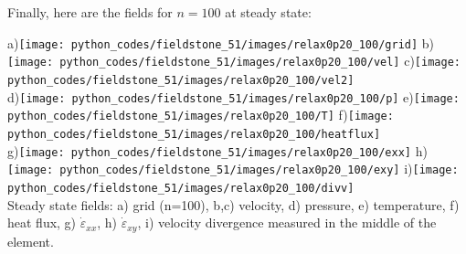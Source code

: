 Finally, here are the fields for $n=100$ at steady state:

\begin{center}
a)\texttt{[image: python\_codes/fieldstone\_51/images/relax0p20\_100/grid]}
b)\texttt{[image: python\_codes/fieldstone\_51/images/relax0p20\_100/vel]}
c)\texttt{[image: python\_codes/fieldstone\_51/images/relax0p20\_100/vel2]}\\
d)\texttt{[image: python\_codes/fieldstone\_51/images/relax0p20\_100/p]}
e)\texttt{[image: python\_codes/fieldstone\_51/images/relax0p20\_100/T]}
f)\texttt{[image: python\_codes/fieldstone\_51/images/relax0p20\_100/heatflux]}\\
g)\texttt{[image: python\_codes/fieldstone\_51/images/relax0p20\_100/exx]}
h)\texttt{[image: python\_codes/fieldstone\_51/images/relax0p20\_100/exy]}
i)\texttt{[image: python\_codes/fieldstone\_51/images/relax0p20\_100/divv]}\\
{\small Steady state fields: a) grid (n=100), b,c) velocity, d) pressure, e) temperature,
f) heat flux, g) $\dot{\varepsilon}_{xx}$, h) $\dot{\varepsilon}_{xy}$, i) velocity 
divergence measured in the middle of the element.}
\end{center}




